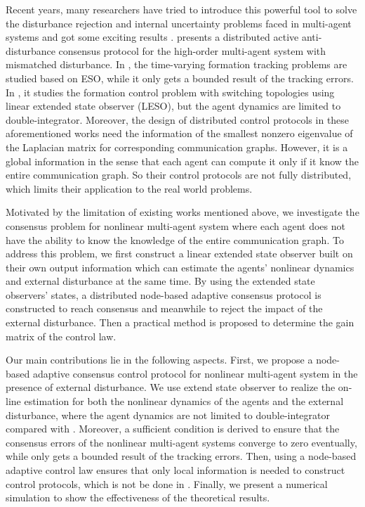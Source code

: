 \documentclass[english]{cccconf}
\begin{document}
Recent years, many researchers have tried to introduce this powerful tool to solve the disturbance rejection  and internal uncertainty problems faced in multi-agent systems and got some exciting results \cite{XiangyuWangTAC2017,DongCCC2017,Qin2014}. \cite{XiangyuWangTAC2017} presents a distributed active anti-disturbance consensus protocol for the high-order multi-agent system with mismatched disturbance. In \cite{DongCCC2017}, the time-varying formation tracking problems are studied based on ESO, while it only gets a bounded result of the tracking errors. In \cite{Qin2014}, it studies the formation control problem with switching topologies using linear extended state observer (LESO), but the agent dynamics are limited to double-integrator. Moreover, the design of distributed control protocols in these aforementioned works need the information of the smallest nonzero eigenvalue of the Laplacian matrix for corresponding communication graphs. However, it is a global information in the sense that each agent can compute it only if it know the entire communication graph. So their control protocols are not fully distributed, which limits their application to the real world problems. 

Motivated by the limitation of existing works mentioned above, we investigate the consensus problem for nonlinear multi-agent system where each agent does not have the ability to know the knowledge of the entire communication graph. To address this problem, we first construct a linear extended state observer built on their own output information which can estimate the agents' nonlinear dynamics and external disturbance at the same time. By using the extended state observers' states, a distributed node-based adaptive consensus protocol is constructed to reach consensus and meanwhile to reject the impact of the external disturbance. Then a practical method is proposed to determine the gain matrix of the control law.

Our main contributions lie in the following aspects. %
First, we propose a node-based adaptive consensus control protocol for nonlinear multi-agent system in the presence of external disturbance. We use extend state observer to realize the on-line estimation for both the nonlinear dynamics of the agents and the external disturbance, where the agent dynamics are not limited to double-integrator compared with \cite{Qin2014}. Moreover, a sufficient condition is derived to ensure that the consensus errors of the nonlinear multi-agent systems converge to zero eventually, while \cite{DongCCC2017} only gets a bounded result of the tracking errors. Then, using a node-based adaptive control law ensures that only local information is needed to construct control protocols, which is not be done in \cite{XiangyuWangTAC2017,DongCCC2017,Qin2014}.  Finally, we present a numerical simulation to show the effectiveness of the theoretical results.
\end{document}
